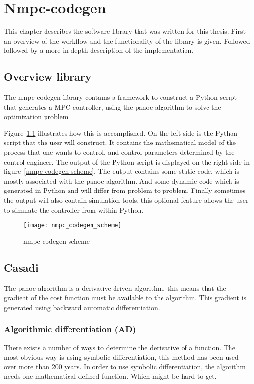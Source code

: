 \chapter{Nmpc-codegen}
This chapter describes the software library that was written for this thesis. First an overview of the workflow and the functionality of the library is given. Followed followed by a more in-depth description of the implementation.
\section{Overview library}
The nmpc-codegen library contains a framework to construct a Python script that generates a MPC controller, using the panoc algorithm to solve the optimization problem.

Figure~\ref{fig:nmpc-codegen scheme} illustrates how this is accomplished. On the left side is the Python script that the user will construct. It contains the mathematical model of the process that one wants to control, and control parameters determined by the control engineer. The output of the Python script is displayed on the right side in figure~\ref{nmpc-codegen scheme}. The output contains some static code, which is mostly associated with the panoc algorithm. And some dynamic code which is generated in Python and will differ from problem to problem. Finally sometimes the output will also contain simulation tools, this optional feature allows the user to simulate the controller from within Python.
	\begin{figure}[H]
		\centering
		\texttt{[image: nmpc\_codegen\_scheme]}
		\caption{nmpc-codegen scheme}
		\label{fig:nmpc-codegen scheme}
	\end{figure}

\section{Casadi}
The panoc algorithm is a derivative driven algorithm, this means that the gradient of the cost function must be available to the algorithm. This gradient is generated using backward automatic differentiation.


\subsection{Algorithmic differentiation (AD)}
There exists a number of ways to determine the derivative of a function. The most obvious way is using symbolic differentiation, this method has been used over more than 200 years. In order to use symbolic differentiation, the algorithm needs one mathematical defined function. Which might be hard to get.

